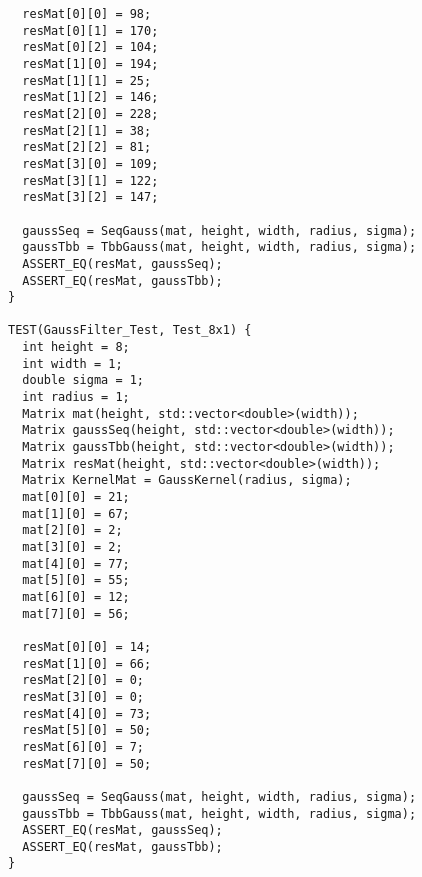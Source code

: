 \documentclass{report}
\begin{document}
\begin{lstlisting}
  resMat[0][0] = 98;
  resMat[0][1] = 170;
  resMat[0][2] = 104;
  resMat[1][0] = 194;
  resMat[1][1] = 25;
  resMat[1][2] = 146;
  resMat[2][0] = 228;
  resMat[2][1] = 38;
  resMat[2][2] = 81;
  resMat[3][0] = 109;
  resMat[3][1] = 122;
  resMat[3][2] = 147;

  gaussSeq = SeqGauss(mat, height, width, radius, sigma);
  gaussTbb = TbbGauss(mat, height, width, radius, sigma);
  ASSERT_EQ(resMat, gaussSeq);
  ASSERT_EQ(resMat, gaussTbb);
}

TEST(GaussFilter_Test, Test_8x1) {
  int height = 8;
  int width = 1;
  double sigma = 1;
  int radius = 1;
  Matrix mat(height, std::vector<double>(width));
  Matrix gaussSeq(height, std::vector<double>(width));
  Matrix gaussTbb(height, std::vector<double>(width));
  Matrix resMat(height, std::vector<double>(width));
  Matrix KernelMat = GaussKernel(radius, sigma);
  mat[0][0] = 21;
  mat[1][0] = 67;
  mat[2][0] = 2;
  mat[3][0] = 2;
  mat[4][0] = 77;
  mat[5][0] = 55;
  mat[6][0] = 12;
  mat[7][0] = 56;

  resMat[0][0] = 14;
  resMat[1][0] = 66;
  resMat[2][0] = 0;
  resMat[3][0] = 0;
  resMat[4][0] = 73;
  resMat[5][0] = 50;
  resMat[6][0] = 7;
  resMat[7][0] = 50;

  gaussSeq = SeqGauss(mat, height, width, radius, sigma);
  gaussTbb = TbbGauss(mat, height, width, radius, sigma);
  ASSERT_EQ(resMat, gaussSeq);
  ASSERT_EQ(resMat, gaussTbb);
}



\end{lstlisting}
\end{document}
